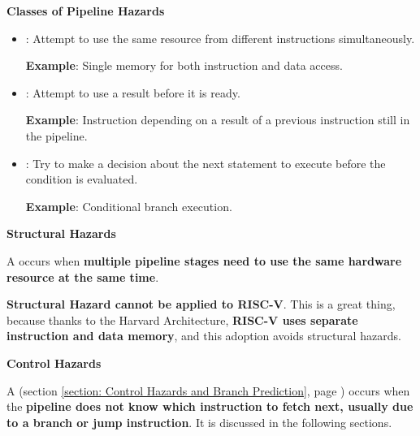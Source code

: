 \highspace
\begin{flushleft}
    \textcolor{Green3}{ \textbf{Classes of Pipeline Hazards}}
\end{flushleft}
\begin{itemize}
    \item {}: Attempt to use the same resource from different instructions simultaneously.
    
    \textcolor{Green3}{ \textbf{Example}}: Single memory for both instruction and data access.


    \item {}: Attempt to use a result before it is ready.

    \textcolor{Green3}{ \textbf{Example}}: Instruction depending on a result of a previous instruction still in the pipeline.
    
    
    \item {}: Try to make a decision about the next statement to execute before the condition is evaluated.
    
    \textcolor{Green3}{ \textbf{Example}}: Conditional branch execution.
\end{itemize}

\newpage

\begin{flushleft}
    \textcolor{Green3}{ \textbf{Structural Hazards}}
    \label{def: structural hazards}
\end{flushleft}
A  occurs when \textbf{multiple pipeline stages need to use the same hardware resource at the same time}.

\highspace
\textcolor{Green3}{ \textbf{Structural Hazard cannot be applied to RISC-V}}. This is a great thing, because thanks to the Harvard Architecture, \textbf{RISC-V uses separate instruction and data memory}, and this adoption avoids structural hazards.


\highspace
\begin{flushleft}
    \textcolor{Red2}{ \textbf{Control Hazards}}
\end{flushleft}
A  (section \ref{section: Control Hazards and Branch Prediction}, page \pageref{section: Control Hazards and Branch Prediction}) occurs when the \textbf{pipeline does not know which instruction to fetch next, usually due to a branch or jump instruction}. It is discussed in the following sections.


